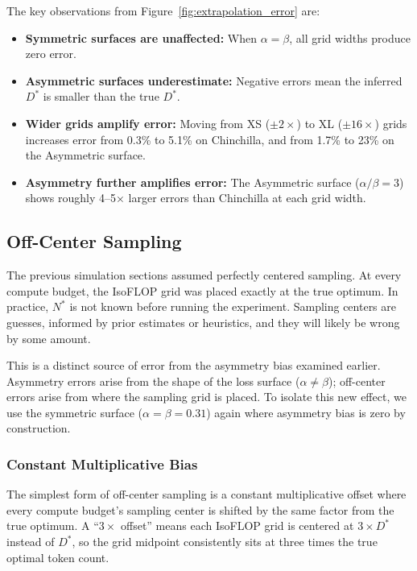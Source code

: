 \documentclass[11pt]{article}
\begin{document}
The key observations from Figure~\ref{fig:extrapolation_error} are:
\begin{itemize}
    \item \textbf{Symmetric surfaces are unaffected:} When $\alpha = \beta$,
        all grid widths produce zero error.
    \item \textbf{Asymmetric surfaces underestimate:} Negative errors mean the
        inferred $D^*$ is smaller than the true $D^*$.
    \item \textbf{Wider grids amplify error:} Moving from XS ($\pm 2\times$) to
        XL ($\pm 16\times$) grids increases error from 0.3\% to 5.1\% on
        Chinchilla, and from 1.7\% to 23\% on the Asymmetric surface.
    \item \textbf{Asymmetry further amplifies error:} The Asymmetric surface
        ($\alpha/\beta = 3$) shows roughly 4--5$\times$ larger errors than
        Chinchilla at each grid width.
\end{itemize}

\subsection{Off-Center Sampling}
\label{sec:off_center}

The previous simulation sections assumed perfectly centered sampling. At every compute
budget, the IsoFLOP grid was placed exactly at the true optimum. In practice,
$N^*$ is not known before running the experiment. Sampling centers are guesses,
informed by prior estimates or heuristics, and they will likely be wrong by
some amount.

This is a distinct source of error from the asymmetry bias examined earlier.
Asymmetry errors arise from the shape of the loss surface
($\alpha \neq \beta$); off-center errors arise from where the sampling grid is
placed. To isolate this new effect, we use the symmetric surface
($\alpha = \beta = 0.31$) again where asymmetry bias is zero by construction.

\subsubsection{Constant Multiplicative Bias}
\label{sec:constant_bias}

The simplest form of off-center sampling is a constant multiplicative offset
where every compute budget's sampling center is shifted by the same factor from
the true optimum. A ``$3\times$ offset'' means each IsoFLOP grid is centered at
$3 \times D^*$ instead of $D^*$, so the grid midpoint consistently sits at
three times the true optimal token count.
\end{document}
